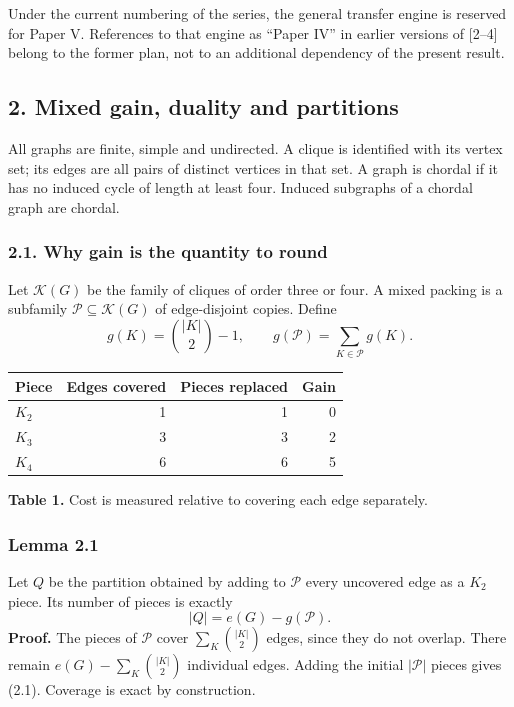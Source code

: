 \documentclass[english,11pt,a4paper]{article}
\newcounter{none}
\begin{document}
Under the current numbering of the series, the general transfer engine is reserved for Paper V. References to that engine as ``Paper IV'' in earlier versions of {[}2--4{]} belong to the former plan, not to an additional dependency of the present result.

\subsection{2. Mixed gain, duality and partitions}\label{mixed-gain-duality-and-partitions}

All graphs are finite, simple and undirected. A clique is identified with its vertex set; its edges are all pairs of distinct vertices in that set. A graph is chordal if it has no induced cycle of length at least four. Induced subgraphs of a chordal graph are chordal.

\subsubsection{2.1. Why gain is the quantity to round}\label{why-gain-is-the-quantity-to-round}

Let \(\mathcal K(G)\) be the family of cliques of order three or four. A mixed packing is a subfamily \(\mathcal P\subseteq\mathcal K(G)\) of edge-disjoint copies. Define \[
g(K)=\binom{|K|}{2}-1,\qquad
g(\mathcal P)=\sum_{K\in\mathcal P}g(K).
\]


{\def\LTcaptype{none} %
\begin{longtable}[c]{@{}lrrr@{}}
\toprule\noalign{}
Piece & Edges covered & Pieces replaced & Gain \\
\midrule\noalign{}
\endhead
\bottomrule\noalign{}
\endlastfoot
\(K_2\) & 1 & 1 & 0 \\
\(K_3\) & 3 & 3 & 2 \\
\(K_4\) & 6 & 6 & 5 \\
\end{longtable}
}

\textbf{Table 1.} Cost is measured relative to covering each edge separately.

\subsubsection{Lemma 2.1}\label{lemma-2.1}

Let \(Q\) be the partition obtained by adding to \(\mathcal P\) every uncovered edge as a \(K_2\) piece. Its number of pieces is exactly \[
|Q|=e(G)-g(\mathcal P).
\tag{2.1}
\] \textbf{Proof.} The pieces of \(\mathcal P\) cover \(\sum_K\binom{|K|}{2}\) edges, since they do not overlap. There remain \(e(G)-\sum_K\binom{|K|}{2}\) individual edges. Adding the initial \(|\mathcal P|\) pieces gives (2.1). Coverage is exact by construction.
\end{document}
